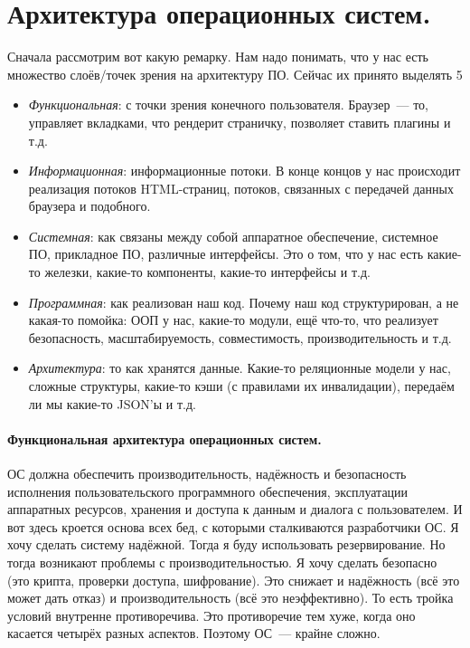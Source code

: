 \documentclass{article}
\begin{document}
    \section{Архитектура операционных систем.}
    Сначала рассмотрим вот какую ремарку. Нам надо понимать, что у нас есть множество слоёв/точек зрения на архитектуру ПО. Сейчас их принято выделять 5
    \begin{itemize}
        \item \textit{Функциональная}: с точки зрения конечного пользователя. Браузер~--- то, управляет вкладками, что рендерит страничку, позволяет ставить плагины и т.д.
        \item \textit{Информационная}: информационные потоки. В конце концов у нас происходит реализация потоков HTML-страниц, потоков, связанных с передачей данных браузера и подобного.
        \item \textit{Системная}: как связаны между собой аппаратное обеспечение, системное ПО, прикладное ПО, различные интерфейсы. Это о том, что у нас есть какие-то железки, какие-то компоненты, какие-то интерфейсы и т.д.
        \item \textit{Программная}: как реализован наш код. Почему наш код структурирован, а не какая-то помойка: ООП у нас, какие-то модули, ещё что-то, что реализует безопасность, масштабируемость, совместимость, производительность и т.д.
        \item \textit{Архитектура}: то как хранятся данные. Какие-то реляционные модели у нас, сложные структуры, какие-то кэши (с правилами их инвалидации), передаём ли мы какие-то JSON'ы и т.д.
    \end{itemize}
    \paragraph{Функциональная архитектура операционных систем.}
    ОС должна обеспечить производительность, надёжность и безопасность исполнения пользовательского программного обеспечения, эксплуатации аппаратных ресурсов, хранения и доступа к данным и диалога с пользователем. И вот здесь кроется основа всех бед, с которыми сталкиваются разработчики ОС. Я хочу сделать систему надёжной. Тогда я буду использовать резервирование. Но тогда возникают проблемы с производительностью. Я хочу сделать безопасно (это крипта, проверки доступа, шифрование). Это снижает и надёжность (всё это может дать отказ) и производительность (всё это неэффективно). То есть тройка условий внутренне противоречива. Это противоречие тем хуже, когда оно касается четырёх разных аспектов. Поэтому ОС~--- крайне сложно.
    
\end{document}
